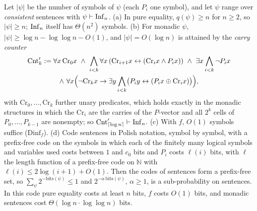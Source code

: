 \begin{proposition}\label{prop:terms:bits}
Let $\lvert\psi\rvert$ be the number of symbols of $\psi$ (each $P_i$ one symbol), and let $\psi$ range over \emph{consistent} sentences with $\psi\vdash\mathrm{Inf}_{n}$.
(a) In pure equality, $q(\psi)\ge n$ for $n\ge2$, so $\lvert\psi\rvert\ge n$; $\mathrm{Inf}_{n}$ itself has $\Theta(n^2)$ symbols.
(b) For monadic $\psi$, $\lvert\psi\rvert\ge\log n-\log\log n-O(1)$, and $\lvert\psi\rvert=O(\log n)$ is attained by the \emph{carry counter}
\begin{multline*}
\mathrm{Cnt}'_k:=\forall x\,\mathrm{Cr}_0x\ \wedge\ \bigwedge_{i<k}\forall x\,(\mathrm{Cr}_{i+1}x\leftrightarrow(\mathrm{Cr}_ix\wedge P_ix))\ \wedge\ \exists x\bigwedge_{i<k}\neg P_ix\\
\wedge\ \forall x\Bigl(\neg\mathrm{Cr}_kx\to\exists y\bigwedge_{i<k}\bigl(P_iy\leftrightarrow(P_ix\oplus\mathrm{Cr}_ix)\bigr)\Bigr),
\end{multline*}
with $\mathrm{Cr}_0,\dots,\mathrm{Cr}_k$ further unary predicates, which holds exactly in the monadic structures in which the $\mathrm{Cr}_i$ are the carries of the $P$-vector and all $2^k$ cells of $P_0,\dots,P_{k-1}$ are nonempty; so $\mathrm{Cnt}'_{\lceil\log n\rceil}\vdash\mathrm{Inf}_{n}$.
(c) With $f$, $O(1)$ symbols suffice ($\mathrm{Dinf}_f$).
(d) Code sentences in Polish notation, symbol by symbol, with a prefix-free code on the symbols in which each of the finitely many logical symbols and variables used costs between $1$ and $c_0$ bits and $P_i$ costs $\ell(i)$ bits, with $\ell$ the length function of a prefix-free code on $\mathbb N$ with $\ell(i)\le2\log(i+1)+O(1)$. Then the codes of sentences form a prefix-free set, so $\sum_\psi2^{-\mathrm{bits}(\psi)}\le1$ and $2^{-\alpha\,\mathrm{bits}(\psi)}$, $\alpha\ge1$, is a sub-probability on sentences. In this code pure equality costs at least $n$ bits, $f$ costs $O(1)$ bits, and monadic sentences cost $\Theta(\log n\cdot\log\log n)$ bits.
\end{proposition}

